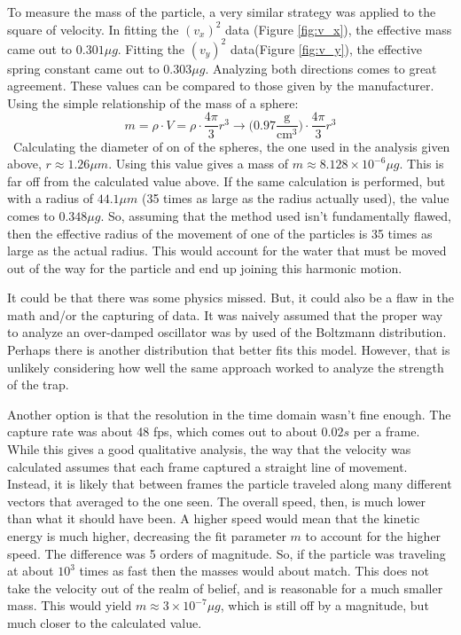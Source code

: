 \documentclass[12pt]{article}
\begin{document}
To measure the mass of the particle, a very similar strategy was applied to the square of velocity. In fitting the $(v_x)^2$ data (Figure \ref{fig:v_x}), the effective mass came out to $0.301 \mu g$. Fitting the $(v_y)^2$ data(Figure \ref{fig:v_y}), the effective spring constant came out to $0.303 \mu g$. Analyzing both directions comes to great agreement. These values can be compared to those given by the manufacturer. Using the simple relationship of the mass of a sphere:
\[m = \rho \cdot V = \rho \cdot \frac{4 \pi}{3}r^3 \rightarrow \Big(0.97 \frac{\text{g}}{\text{cm}^3}\Big) \cdot \frac{4 \pi}{3}r^3\]\
Calculating the diameter of on of the spheres, the one used in the analysis given above, $r \approx 1.26 \mu m$. Using this value gives a mass of $m \approx 8.128 \times 10^{-6} \mu g$. This is far off from the calculated value above. If the same calculation is performed, but with a radius of $44.1 \mu m$ (35 times as large as the radius actually used), the value comes to $0.348 \mu g$. So, assuming that the method used isn't fundamentally flawed, then the effective radius of the movement of one of the particles is 35 times as large as the actual radius. This would account for the water that must be moved out of the way for the particle and end up joining this harmonic motion. 

It could be that there was some physics missed. But, it could also be a flaw in the math and/or the capturing of data. It was naively assumed that the proper way to analyze an over-damped oscillator was by used of the Boltzmann distribution. Perhaps there is another distribution that better fits this model. However, that is unlikely considering how well the same approach worked to analyze the strength of the trap. 

Another option is that the resolution in the time domain wasn't fine enough. The capture rate was about 48 fps, which comes out to about $0.02s$ per a frame. While this gives a good qualitative analysis, the way that the velocity was calculated assumes that each frame captured a straight line of movement. Instead, it is likely that between frames the particle traveled along many different vectors that averaged to the one seen. The overall speed, then, is much lower than what it should have been. A higher speed would mean that the kinetic energy is much higher, decreasing the fit parameter $m$ to account for the higher speed. The difference was 5 orders of magnitude. So, if the particle was traveling at about $10^3$ times as fast then the masses would about match. This does not take the velocity out of the realm of belief, and is reasonable for a much smaller mass. This would yield $m \approx 3 \times 10^{-7} \mu g$, which is still off by a magnitude, but much closer to the calculated value. 
\end{document}

